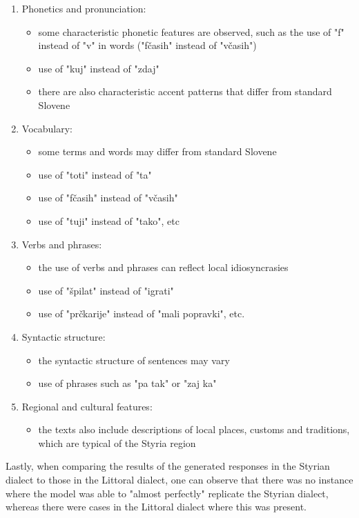 \documentclass[fleqn,moreauthors,10pt]{ds_report}
\begin{document}
\begin{enumerate}
    \item Phonetics and pronunciation: 
        \begin{itemize}
        \item some characteristic phonetic features are observed, such as the use of "f" instead of "v" in words ("fčasih" instead of "včasih")
        \item use of "kuj" instead of "zdaj"
        \item there are also characteristic accent patterns that differ from standard Slovene
    \end{itemize}
    \item Vocabulary:
        \begin{itemize}
        \item some terms and words may differ from standard Slovene
        \item use of "toti" instead of "ta"
        \item use of "fčasih" instead of "včasih"
        \item use of "tuji" instead of "tako", etc
    \end{itemize}
    \item Verbs and phrases:
        \begin{itemize}
        \item the use of verbs and phrases can reflect local idiosyncrasies
        \item use of "špilat" instead of "igrati"
        \item use of "prčkarije" instead of "mali popravki", etc.
    \end{itemize}
    \item Syntactic structure:
        \begin{itemize}
        \item the syntactic structure of sentences may vary
        \item use of phrases such as "pa tak" or "zaj ka"
    \end{itemize}
    \item Regional and cultural features:
        \begin{itemize}
        \item the texts also include descriptions of local places, customs and traditions, which are typical of the Styria region
    \end{itemize}
\end{enumerate}

 Lastly, when comparing the results of the generated responses in the Styrian dialect to those in the Littoral dialect, one can observe that there was no instance where the model was able to "almost perfectly" replicate the Styrian dialect, whereas there were cases in the Littoral dialect where this was present.
\end{document}
